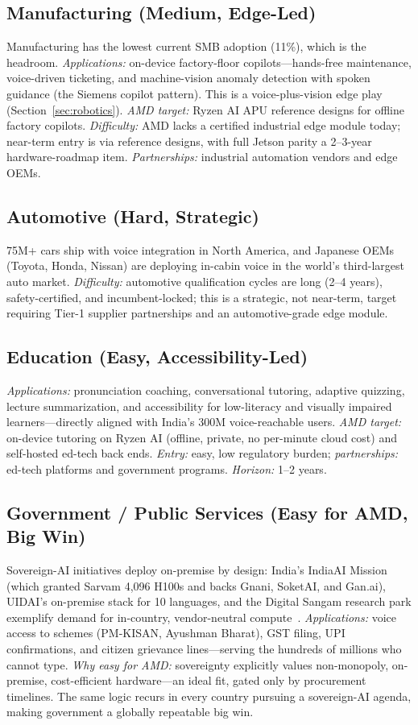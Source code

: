 \documentclass[blind]{gtac}
\begin{document}
\subsection{Manufacturing (Medium, Edge-Led)}
Manufacturing has the lowest current SMB adoption (11\%), which is the headroom. \emph{Applications:} on-device factory-floor copilots---hands-free maintenance, voice-driven ticketing, and machine-vision anomaly detection with spoken guidance (the Siemens copilot pattern). This is a voice-plus-vision edge play (Section~\ref{sec:robotics}). \emph{AMD target:} Ryzen AI APU reference designs for offline factory copilots. \emph{Difficulty:} AMD lacks a certified industrial edge module today; near-term entry is via reference designs, with full Jetson parity a 2--3-year hardware-roadmap item. \emph{Partnerships:} industrial automation vendors and edge OEMs.

\subsection{Automotive (Hard, Strategic)}
75M+ cars ship with voice integration in North America, and Japanese OEMs (Toyota, Honda, Nissan) are deploying in-cabin voice in the world's third-largest auto market. \emph{Difficulty:} automotive qualification cycles are long (2--4 years), safety-certified, and incumbent-locked; this is a strategic, not near-term, target requiring Tier-1 supplier partnerships and an automotive-grade edge module.

\subsection{Education (Easy, Accessibility-Led)}
\emph{Applications:} pronunciation coaching, conversational tutoring, adaptive quizzing, lecture summarization, and accessibility for low-literacy and visually impaired learners---directly aligned with India's 300M voice-reachable users. \emph{AMD target:} on-device tutoring on Ryzen AI (offline, private, no per-minute cloud cost) and self-hosted ed-tech back ends. \emph{Entry:} easy, low regulatory burden; \emph{partnerships:} ed-tech platforms and government programs. \emph{Horizon:} 1--2 years.

\subsection{Government / Public Services (Easy for AMD, Big Win)}
Sovereign-AI initiatives deploy on-premise by design: India's IndiaAI Mission (which granted Sarvam 4,096 H100s and backs Gnani, SoketAI, and Gan.ai), UIDAI's on-premise stack for 10 languages, and the Digital Sangam research park exemplify demand for in-country, vendor-neutral compute~\cite{india_guide,inc42_sarvam}. \emph{Applications:} voice access to schemes (PM-KISAN, Ayushman Bharat), GST filing, UPI confirmations, and citizen grievance lines---serving the hundreds of millions who cannot type. \emph{Why easy for AMD:} sovereignty explicitly values non-monopoly, on-premise, cost-efficient hardware---an ideal fit, gated only by procurement timelines. The same logic recurs in every country pursuing a sovereign-AI agenda, making government a globally repeatable big win.
\end{document}
